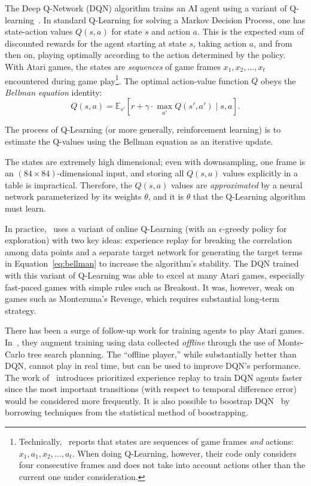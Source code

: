 \documentclass[letterpaper, 10pt, conference]{ieeeconf}
\begin{document}
The Deep Q-Network (DQN) algorithm trains an AI agent using a variant of
Q-learning~\cite{Sutton_1998}. In standard Q-Learning for solving a Markov
Decision Process, one has state-action values $Q(s,a)$ for state $s$ and action
$a$. This is the expected sum of discounted rewards for the agent starting at
state $s$, taking action $a$, and from then on, playing optimally according to
the action determined by the policy.  With Atari games, the states are
\emph{sequences} of game frames $x_1,x_2,\ldots,x_t$ encountered during game
play\footnote{Technically,~\cite{mnih-dqn-2015} reports that states are
sequences of game frames \emph{and} actions: $x_1,a_1,x_2,\ldots,a_t$. When
doing Q-Learning, however, their code only considers four consecutive frames and
does not take into account actions other than the current one under
consideration.}. The optimal action-value function $Q$ obeys the \emph{Bellman
equation} identity: 
\begin{equation}\label{eq:bellman}
Q(s,a) = \mathbb{E}_{s'}\left[r + \gamma \cdot \max_{a'} Q(s',a') \mid s,a \right].
\end{equation}

The process of Q-Learning (or more generally, reinforcement learning) is to
estimate the Q-values using the Bellman equation as an iterative update.

The states are extremely high dimensional; even with downsampling, one frame is
an $(84\times 84)$-dimensional input, and storing all $Q(s,a)$ values explicitly
in a table is impractical.  Therefore, the $Q(s,a)$ values are
\emph{approximated} by a neural network parameterized by its weights $\theta$,
and it is $\theta$ that the Q-Learning algorithm must learn.

In practice,~\cite{mnih-dqn-2015} uses a variant of online Q-Learning (with an
$\epsilon$-greedy policy for exploration) with two key ideas: experience replay
for breaking the correlation among data points and a separate target network
for generating the target terms in Equation~\ref{eq:bellman} to increase the
algorithm's stability. The DQN trained with this variant of Q-Learning was able
to excel at many Atari games, especially fast-paced games with simple rules such
as Breakout. It was, however, weak on games such as Montezuma's Revenge, which
requires substantial long-term strategy.

There has been a surge of follow-up work for training agents to play Atari
games.  In~\cite{nips-atari-2014}, they augment training using data collected
\emph{offline} through the use of Monte-Carlo tree search planning. The
``offline player,'' while substantially better than DQN, cannot play in real
time, but can be used to improve DQN's performance. The work
of~\cite{Schaul2016} introduces prioritized experience replay to
train DQN agents faster since the most important transitions (with respect to
temporal difference error) would be considered more frequently. It is also
possible to boostrap DQN~\cite{NIPS2016_6501} by borrowing techniques from
the statistical method of boostrapping.
\end{document}
